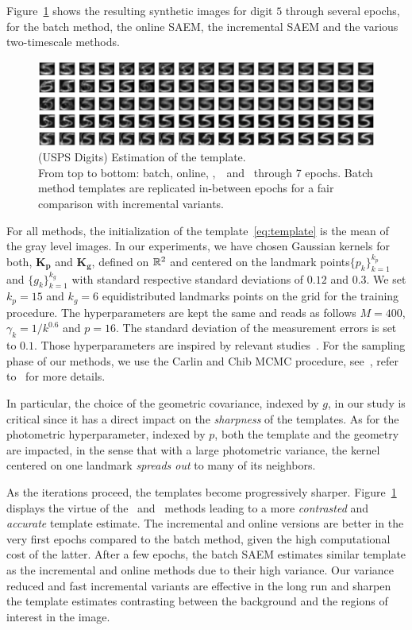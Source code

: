 \documentclass[12pt]{article}
\begin{document}
Figure~\ref{fig:results} shows the resulting synthetic images for digit $5$ through several epochs, for the batch method, the online SAEM, the incremental SAEM and the various two-timescale methods.
\begin{figure}[h]
\includegraphics[width=\textwidth]{fig/deformable3}
\caption{(USPS Digits) Estimation of the template. \\
From top to bottom: batch, online, \ISAEM,\ \SAEMVR\ and \FISAEM\ through 7 epochs. Batch method templates are replicated in-between epochs for a fair comparison with incremental variants. }
\label{fig:results}
\end{figure}
For all methods, the initialization of the template~\eqref{eq:template} is the mean of the gray level images.
In our experiments, we have chosen Gaussian kernels for both, $\mathbf{K}_{\mathbf{p}}$ and $\mathbf{K}_{\mathbf{g}}$, defined on $\mathbb{R}^2$ and centered on the landmark points$\{p_k\}_{k=1}^{k_p}$ and $\{g_k\}_{k=1}^{k_g}$ with standard respective standard deviations of $0.12$ and $0.3$. 
We set $k_p = 15$  and  $k_g = 6$ equidistributed landmarks points on the grid for the training procedure. 
The hyperparameters are kept the same and reads as follows $M = 400$, $ \gamma_k = 1/k^{0.6}$ and $ p = 16$.
The standard deviation of the measurement errors is set to $0.1$.
Those hyperparameters are inspired by relevant studies~\citep{allassonniere2008stochastic,allassonniere2010construction}.
For the sampling phase of our methods, we use the Carlin and Chib MCMC procedure, see~\citet{carlin1995bayesian}, refer to~\citet{maire2016online} for more details.

In particular, the choice of the geometric covariance, indexed by $g$, in our study is critical since it has a direct impact on the \emph{sharpness} of the templates.
As for the photometric hyperparameter, indexed by $p$, both the template and the geometry are impacted, in the sense that with a large photometric variance, the kernel centered on one landmark \emph{spreads out} to many of its neighbors.


As the iterations proceed, the templates become progressively sharper.
Figure~\ref{fig:results} displays the virtue of the \SAEMVR\ and \FISAEM\ methods leading to a more \textit{contrasted} and \textit{accurate} template estimate. 
The incremental and online versions are better in the very first epochs compared to the batch method, given the high computational cost of the latter. 
After a few epochs, the batch SAEM estimates similar template as the incremental and online methods due to their high variance. 
Our variance reduced and fast incremental variants are effective in the long run and sharpen the template estimates contrasting between the background and the regions of interest in the image.
\end{document}
